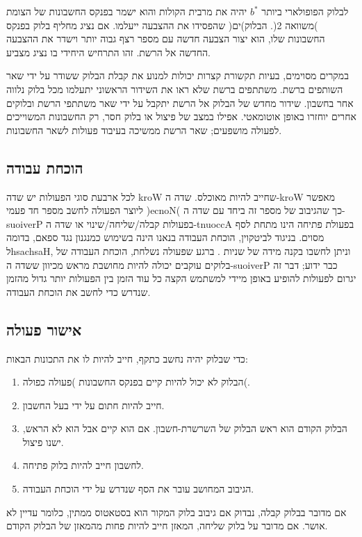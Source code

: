לבלוק הפופולארי ביותר $b^*$ יהיה את מרבית הקולות והוא ישמר בפנקס החשבונות של הצומת )משוואה 2(. הבלוק)ים( שהפסידו את ההצבעה ייעלמו. אם נציג מחליף בלוק בפנקס החשבונות שלו, הוא יצור הצבעה חדשה עם מספר רצף גבוה יותר וישדר את ההצבעה החדשה אל הרשת. זהו התרחיש היחידי בו נציג מצביע.

במקרים מסוימים, בעיות תקשורת קצרות יכולות למנוע את קבלת הבלוק ששודר על ידי שאר השותפים ברשת. משתתפים ברשת שלא ראו את השידור הראשוני יתעלמו מכל בלוק נלווה אחר בחשבון. שידור מחדש של הבלוק אל הרשת יתקבל על ידי שאר משתתפי הרשת ובלוקים אחרים יוחזרו באופן אוטומאטי. אפילו במצב של פיצול או בלוק חסר, רק החשבונות המשוייכים לפעולה מושפעים; שאר הרשת ממשיכה בעיבוד פעולות לשאר החשבונות.

\subsection{הוכחת עבודה} \label{sec:pow}
לכל ארבעת סוגי הפעולות יש שדה kroW שחייב להיות מאוכלס. שדה ה-kroW מאפשר ליוצר הפעולה לחשב מספר חד פעמי )ecnoN( כך שהגיבוב של מספר זה ביחד עם שדה ה-suoiverP בפעולות קבלה/שליחה/שינוי או שדה ה-tnuoccA  בפעולת פתיחה הינו מתחת לסף מסוים. בניגוד לביטקוין, הוכחת העבודה בנאנו הינה בשימוש כמנגנון נגד ספאם, בדומה לhsachsaH, וניתן לחשבו בקנה מידה של שניות \cite{Back_hashcash}. ברגע שפעולה נשלחת, הוכחת העבודה של בלוקים עוקבים יכולה להיות מחושבת מראש מכיוון ששדה ה-suoiverP כבר ידוע; דבר זה יגרום לפעולות להופיע באופן מיידי למשתמש הקצה כל עוד הזמן בין הפעולות יותר גדול מהזמן שנדרש כדי לחשב את הוכחת העבודה.

\subsection{אישור פעולה} \label{sec:transaction_verification}
כדי שבלוק יהיה נחשב כתקף, חייב להיות לו את התכונות הבאות:
\begin{enumerate}
   \item הבלוק לא יכול להיות קיים בפנקס החשבונות )פעולה כפולה(.
   \item חייב להיות חתום על ידי בעל החשבון.
   \item הבלוק הקודם הוא ראש הבלוק של השרשרת-חשבון. אם הוא קיים אבל הוא לא הראש, ישנו פיצול.
   \item לחשבון חייב להיות בלוק פתיחה.
   \item הגיבוב המחושב עובר את הסף שנדרש על ידי הוכחת העבודה.
\end{enumerate}
אם מדובר בבלוק קבלה, נבדוק אם גיבוב בלוק המקור הוא בסטאטוס ממתין, כלומר עדיין לא אושר. אם מדובר על בלוק שליחה, המאזן חייב להיות פחות מהמאזן של הבלוק הקודם.